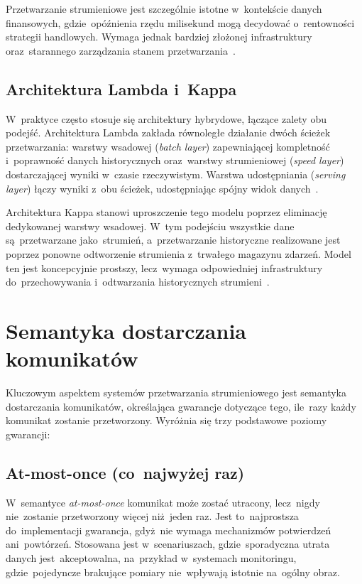 Przetwarzanie strumieniowe jest szczególnie istotne w~kontekście danych finansowych, gdzie~opóźnienia rzędu
milisekund mogą decydować o~rentowności strategii handlowych.
Wymaga jednak bardziej złożonej infrastruktury oraz~starannego zarządzania stanem przetwarzania~\cite{8_requirements}.

\subsection[Architektura Lambda i Kappa]{Architektura Lambda i~Kappa}
\label{subsec:lambda_kappa}

W~praktyce często stosuje się architektury hybrydowe, łączące zalety obu podejść.
Architektura Lambda zakłada równoległe działanie dwóch ścieżek przetwarzania: warstwy wsadowej (\textit{batch layer})
zapewniającej kompletność i~poprawność danych historycznych oraz~warstwy strumieniowej (\textit{speed layer})
dostarczającej wyniki w~czasie rzeczywistym.
Warstwa udostępniania (\textit{serving layer}) łączy wyniki z~obu ścieżek, udostępniając spójny widok danych~\cite{bigdata_principles}.

Architektura Kappa stanowi uproszczenie tego modelu poprzez eliminację dedykowanej warstwy wsadowej.
W~tym podejściu wszystkie dane są~przetwarzane jako~strumień, a~przetwarzanie historyczne realizowane jest poprzez
ponowne odtworzenie strumienia z~trwałego magazynu zdarzeń.
Model ten jest koncepcyjnie prostszy, lecz~wymaga odpowiedniej infrastruktury do~przechowywania i~odtwarzania
historycznych strumieni~\cite{kappa_architecture}.


\section{Semantyka dostarczania komunikatów}
\label{sec:semantyka_dostarczania}

Kluczowym aspektem systemów przetwarzania strumieniowego jest semantyka dostarczania komunikatów, określająca
gwarancje dotyczące tego, ile~razy każdy komunikat zostanie przetworzony.
Wyróżnia się trzy podstawowe poziomy gwarancji:

\subsection[At-most-once (co najwyżej raz)]{At-most-once (co~najwyżej raz)}
\label{subsec:at_most_once}

W~semantyce \textit{at-most-once} komunikat może zostać utracony, lecz~nigdy nie~zostanie przetworzony więcej
niż~jeden raz.
Jest to~najprostsza do~implementacji gwarancja, gdyż~nie wymaga mechanizmów potwierdzeń ani~powtórzeń.
Stosowana jest w~scenariuszach, gdzie~sporadyczna utrata danych jest~akceptowalna, na~przykład w~systemach
monitoringu, gdzie~pojedyncze brakujące pomiary nie~wpływają istotnie na~ogólny obraz.

